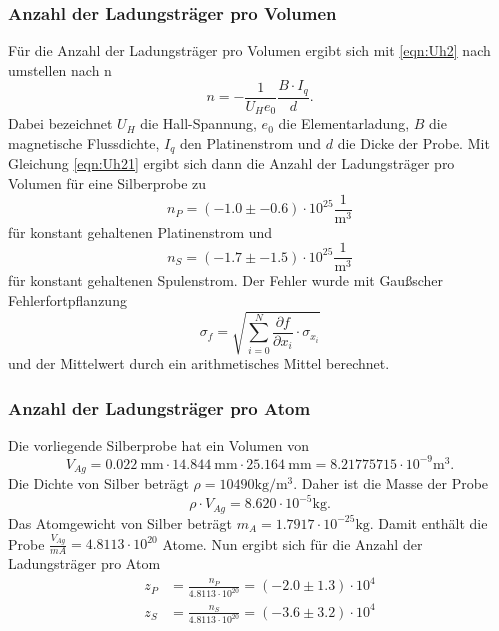     \subsubsection{Anzahl der Ladungsträger pro Volumen}
    \label{sec:ladtrprovol}
        Für die Anzahl der Ladungsträger pro Volumen ergibt sich mit \ref{eqn:Uh2} nach umstellen nach n
        \begin{equation}
            n=-\frac{1}{U_{H} e_0}\frac{B\cdot I_q}{d}. \label{eqn:Uh21}
          \end{equation}
          Dabei bezeichnet $U_{H}$ die Hall-Spannung, $e_{0}$ die Elementarladung, $B$ die magnetische Flussdichte, $I_{q}$ den Platinenstrom und $d$ die Dicke
          der Probe. Mit Gleichung \ref{eqn:Uh21} ergibt sich dann die Anzahl der Ladungsträger pro Volumen für eine Silberprobe zu
          \begin{equation*}
            n_{P} = (-1.0 \pm -0.6) \cdot 10^{25} \frac{1}{\si{\cubic\meter}}
          \end{equation*}
          für konstant gehaltenen Platinenstrom und
          \begin{equation*}
            n_{S} = (-1.7 \pm -1.5) \cdot 10^{25} \frac{1}{\si{\cubic\meter}}
          \end{equation*}
        für konstant gehaltenen Spulenstrom.
        Der Fehler wurde mit Gaußscher Fehlerfortpflanzung
        \begin{equation}
          \sigma_f = \sqrt{\sum_{i=0}^{N} {\frac{\partial f}{\partial x_i} \cdot \sigma_{x_i}}}
          \label{eqn:gauss}
        \end{equation}
        und der Mittelwert durch ein arithmetisches Mittel berechnet.
    \subsubsection{Anzahl der Ladungsträger pro Atom}
       Die vorliegende Silberprobe hat ein Volumen von
       \begin{equation*}
         V_{Ag} = \SI{0.022}{\milli\meter} \cdot \SI{14.844}{\milli\meter} \cdot \SI{25.164}{\milli\meter} = 8.21775715 \cdot 10^{-9} \si{\cubic\meter}.
       \end{equation*}
       Die Dichte von Silber beträgt $\rho = 10490 \si{\kilo\gram\per\cubic\meter}$. Daher ist die Masse der Probe
       \begin{equation*}
         \rho \cdot V_{Ag} = 8.620 \cdot 10^{-5} \si{\kilo\gram}.
       \end{equation*}
       Das Atomgewicht von Silber beträgt $m_{A} = 1.7917 \cdot 10^{-25} \si{\kilo\gram}$.
       Damit enthält die Probe $\frac{V_{Ag}}{m{A}} = 4.8113 \cdot 10^{20}$ Atome.
       Nun ergibt sich für die Anzahl der Ladungsträger pro Atom
       \begin{align*}
         z_{P} & = \frac{n_{P}}{4.8113 \cdot 10^{20}} = (-2.0 \pm 1.3)\cdot 10^{4} \\
         z_{S} & = \frac{n_{S}}{4.8113 \cdot 10^{20}} = (-3.6 \pm 3.2)\cdot 10^{4}
       \end{align*}

